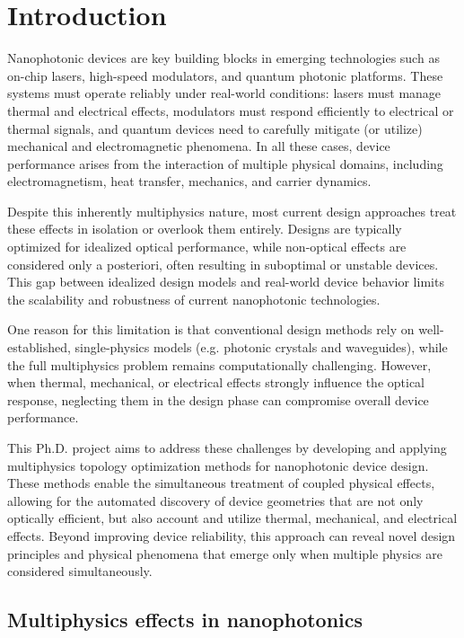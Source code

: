 \chapter{Introduction}
Nanophotonic devices are key building blocks in emerging technologies such as on-chip lasers, high-speed modulators, and quantum photonic platforms. 
These systems must operate reliably under real-world conditions: lasers must manage thermal and electrical effects, modulators must respond efficiently 
to electrical or thermal signals, and quantum devices need to carefully mitigate (or utilize) mechanical and electromagnetic phenomena. In all these cases, device 
performance arises from the interaction of multiple physical domains, including electromagnetism, heat transfer, mechanics, and carrier dynamics.

Despite this inherently multiphysics nature, most current design approaches treat these effects in isolation or overlook them entirely. Designs are typically optimized 
for idealized optical performance, while non-optical effects are considered only a posteriori,
often resulting in suboptimal or unstable devices. This gap between idealized design models and real-world device behavior limits the scalability and robustness of current nanophotonic technologies.

One reason for this limitation is that conventional design methods rely on well-established, single-physics models (e.g. photonic crystals and waveguides), while the full multiphysics problem remains computationally challenging.
However, when thermal, mechanical, or electrical effects strongly influence the optical response, neglecting them in the design phase can compromise overall device performance.

This Ph.D. project aims to address these challenges by developing and applying multiphysics topology optimization methods for nanophotonic device design. These methods enable the simultaneous treatment of coupled physical effects, 
allowing for the automated discovery of device geometries that are not only optically efficient, but also account and utilize thermal, mechanical, and electrical effects. Beyond improving device reliability, this approach can reveal 
novel design principles and physical phenomena that emerge only when multiple physics are considered simultaneously.

\section{Multiphysics effects in nanophotonics}

